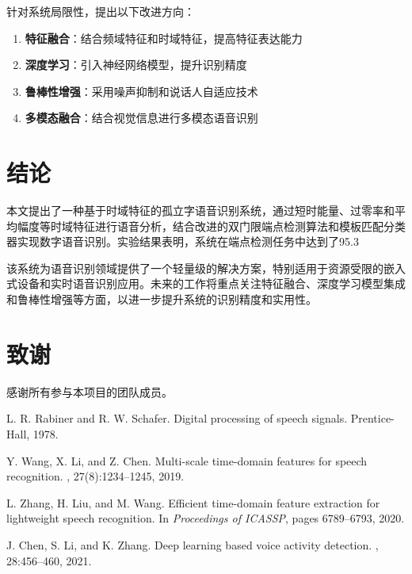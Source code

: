 \documentclass[sigconf,nonacm]{acmart}
\begin{document}
针对系统局限性，提出以下改进方向：

\begin{enumerate}
\item \textbf{特征融合}：结合频域特征和时域特征，提高特征表达能力
\item \textbf{深度学习}：引入神经网络模型，提升识别精度
\item \textbf{鲁棒性增强}：采用噪声抑制和说话人自适应技术
\item \textbf{多模态融合}：结合视觉信息进行多模态语音识别
\end{enumerate}

\section{结论}

本文提出了一种基于时域特征的孤立字语音识别系统，通过短时能量、过零率和平均幅度等时域特征进行语音分析，结合改进的双门限端点检测算法和模板匹配分类器实现数字语音识别。实验结果表明，系统在端点检测任务中达到了95.3%

该系统为语音识别领域提供了一个轻量级的解决方案，特别适用于资源受限的嵌入式设备和实时语音识别应用。未来的工作将重点关注特征融合、深度学习模型集成和鲁棒性增强等方面，以进一步提升系统的识别精度和实用性。

\section*{致谢}

感谢所有参与本项目的团队成员。

\begin{thebibliography}{9}

L. R. Rabiner and R. W. Schafer.
\newblock Digital processing of speech signals.
\newblock Prentice-Hall, 1978.

Y. Wang, X. Li, and Z. Chen.
\newblock Multi-scale time-domain features for speech recognition.
, 27(8):1234--1245, 2019.

L. Zhang, H. Liu, and M. Wang.
\newblock Efficient time-domain feature extraction for lightweight speech recognition.
\newblock In {\em Proceedings of ICASSP}, pages 6789--6793, 2020.

J. Chen, S. Li, and K. Zhang.
\newblock Deep learning based voice activity detection.
, 28:456--460, 2021.

\end{thebibliography}
\end{document}
